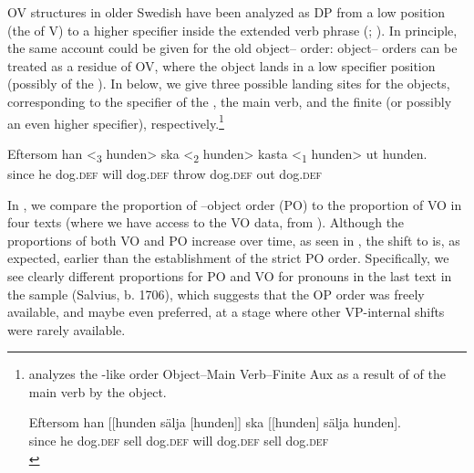 \documentclass[output=paper]{langscibook}
\begin{document}
OV structures in older Swedish have been analyzed as DP  from a low  position (the  of V) to a higher specifier inside the extended verb phrase (\citealt{Delsing1999}; \citealt{Petzell2011, Petzell2012}). In principle, the same account could be given for the old object– order: object– orders can be treated as a residue of OV, where the object lands in a low specifier position (possibly of the ). In  below, we give three possible landing sites for the objects, corresponding to the specifier of the , the main verb, and the finite  (or possibly an even higher specifier), respectively.\footnote{\citet{Petzell2012} analyzes the -like order Object–Main Verb–Finite Aux as a result of  of the main verb by the object.

    \ea
    \gll  Eftersom    han [[hunden   sälja [hunden]]   ska [[hunden]   sälja   hunden].\\
    since   he     dog.\textsc{def}   sell       dog.\textsc{def}     will   dog.\textsc{def}     sell   dog.\textsc{def}\\
    \z}


\ea\label{ex:lalu:46}
\gll Eftersom  han {<\textsubscript{3} hunden>}   ska   {<\textsubscript{2} hunden>} kasta     {<\textsubscript{1} hunden>}   ut     hunden.\\
since        he      dog\textsc{.def}  will     dog\textsc{.def}  throw        dog\textsc{.def}   out   dog\textsc{.def}\\
\z


In , we compare the proportion of –object order (PO) to the proportion of VO in four texts (where we have access to the VO data, from \citealt{Petzell2012}). Although the proportions of both VO and PO increase over time, as seen in , the shift to  is, as expected, earlier than the establishment of the strict PO order. Specifically, we see clearly different proportions for PO and VO for pronouns in the last text in the sample (Salvius, b. 1706), which suggests that the OP order was freely available, and maybe even preferred, at a stage where other VP-internal shifts were rarely available.\largerpage
\end{document}
